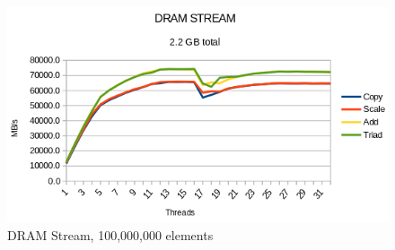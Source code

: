 \documentclass[12pt,a4paper,USenglish]{article}      %
\begin{document}
\begin{figure}[!hbtp]
\includegraphics[scale=0.7]{Benchmarks/DRAM_STREAM_100M_Figure.png}
\caption{DRAM Stream, 100,000,000 elements}
\label{fig:DRAM_STREAM_100M_Figure}
\end{figure}
\end{document}

